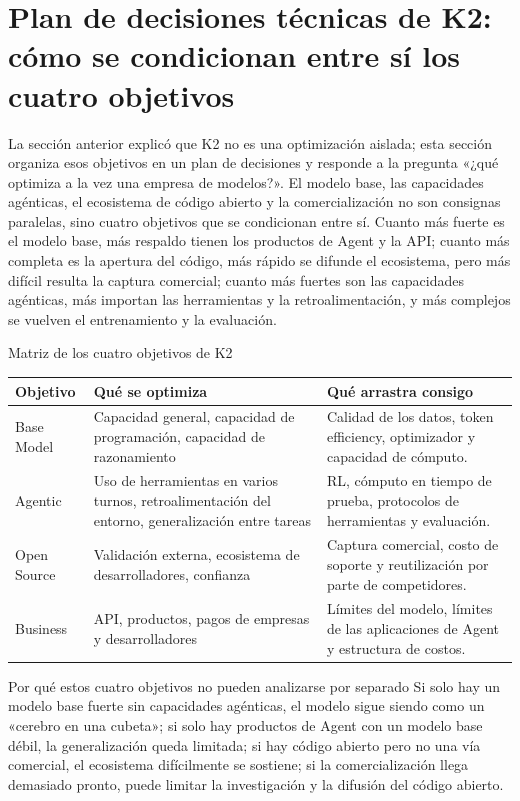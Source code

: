 \section{Plan de decisiones técnicas de K2: cómo se condicionan entre sí los cuatro objetivos}

La sección anterior explicó que K2 no es una optimización aislada; esta sección organiza esos objetivos en un plan de decisiones y responde a la pregunta «¿qué optimiza a la vez una empresa de modelos?». El modelo base, las capacidades agénticas, el ecosistema de código abierto y la comercialización no son consignas paralelas, sino cuatro objetivos que se condicionan entre sí. Cuanto más fuerte es el modelo base, más respaldo tienen los productos de Agent y la API; cuanto más completa es la apertura del código, más rápido se difunde el ecosistema, pero más difícil resulta la captura comercial; cuanto más fuertes son las capacidades agénticas, más importan las herramientas y la retroalimentación, y más complejos se vuelven el entrenamiento y la evaluación.

\begin{knowledgebox}{Matriz de los cuatro objetivos de K2}
\begin{tabularx}{\textwidth}{p{}p{}p{}}
\toprule
Objetivo & Qué se optimiza & Qué arrastra consigo \\
\midrule
Base Model & Capacidad general, capacidad de programación, capacidad de razonamiento & Calidad de los datos, token efficiency, optimizador y capacidad de cómputo. \\
Agentic & Uso de herramientas en varios turnos, retroalimentación del entorno, generalización entre tareas & RL, cómputo en tiempo de prueba, protocolos de herramientas y evaluación. \\
Open Source & Validación externa, ecosistema de desarrolladores, confianza & Captura comercial, costo de soporte y reutilización por parte de competidores. \\
Business & API, productos, pagos de empresas y desarrolladores & Límites del modelo, límites de las aplicaciones de Agent y estructura de costos. \\
\bottomrule
\end{tabularx}
\end{knowledgebox}

\begin{importantbox}{Por qué estos cuatro objetivos no pueden analizarse por separado}
Si solo hay un modelo base fuerte sin capacidades agénticas, el modelo sigue siendo como un «cerebro en una cubeta»; si solo hay productos de Agent con un modelo base débil, la generalización queda limitada; si hay código abierto pero no una vía comercial, el ecosistema difícilmente se sostiene; si la comercialización llega demasiado pronto, puede limitar la investigación y la difusión del código abierto.
\end{importantbox}

